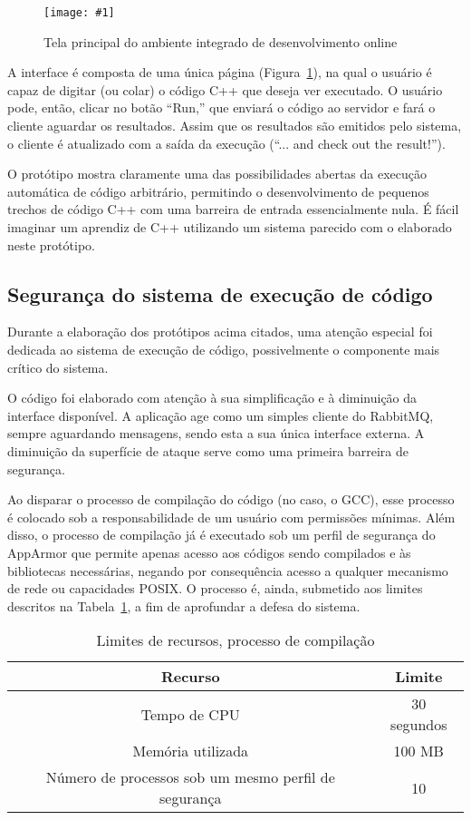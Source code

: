 \documentclass[ruledheader, 12pt]{abnt}
\newcommand{\figcustom}[4]{\par
	\begin{figure}[#3]
		\centering
		\texttt{[image: \#1]}
		\caption{\label{fig:#1}#2}
	\end{figure}
\par}
\newcommand{\figref}[1]{(Figura~\ref{fig:#1})}
\newcommand{\tblref}[1]{Tabela~\ref{tbl:#1}}
\begin{document}
\figcustom{ide}{Tela principal do ambiente integrado de desenvolvimento online}{tp}{.9}

A interface é composta de uma única página \figref{ide}, na qual o usuário é capaz de digitar (ou colar) o código C++ que deseja ver executado. O usuário pode, então, clicar no botão ``Run,'' que enviará o código ao servidor e fará o cliente aguardar os resultados. Assim que os resultados são emitidos pelo sistema, o cliente é atualizado com a saída da execução (``... and check out the result!'').

O protótipo mostra claramente uma das possibilidades abertas da execução automática de código arbitrário, permitindo o desenvolvimento de pequenos trechos de código C++ com uma barreira de entrada essencialmente nula. É fácil imaginar um aprendiz de C++ utilizando um sistema parecido com o elaborado neste protótipo.

\subsection{Segurança do sistema de execução de código}

Durante a elaboração dos protótipos acima citados, uma atenção especial foi dedicada ao sistema de execução de código, possivelmente o componente mais crítico do sistema. 

O código foi elaborado com atenção à sua simplificação e à diminuição da interface disponível. A aplicação age como um simples cliente do RabbitMQ, sempre aguardando mensagens, sendo esta a sua única interface externa. A diminuição da superfície de ataque serve como uma primeira barreira de segurança.


Ao disparar o processo de compilação do código (no caso, o GCC), esse processo é colocado sob a responsabilidade de um usuário com permissões mínimas. Além disso, o processo de compilação já é executado sob um perfil de segurança do AppArmor que permite apenas acesso aos códigos sendo compilados e às bibliotecas necessárias, negando por consequência acesso a qualquer mecanismo de rede ou capacidades POSIX. O processo é, ainda, submetido aos limites descritos na \tblref{compilation-limits}, a fim de aprofundar a defesa do sistema.

\begin{table}[h]
	\centering
	\caption{\label{tbl:compilation-limits}Limites de recursos, processo de compilação}
	\begin{tabular}{c c}\hline
		\hline
		Recurso & Limite \\\hline
		\hline
		Tempo de CPU & 30 segundos \\\hline
		Memória utilizada & 100 MB \\\hline
		Número de processos sob um mesmo perfil de segurança & 10 \\\hline
		\hline
	\end{tabular}
\end{table}
\end{document}
